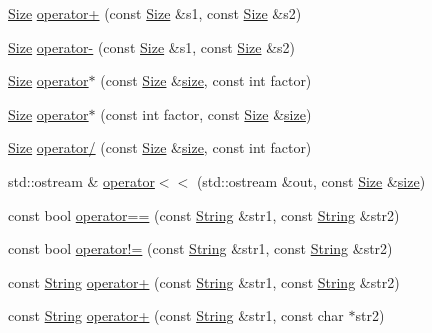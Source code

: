 \begin{DoxyCompactItemize}
\item 
\hyperlink{classprism_1_1_size}{Size} \hyperlink{namespaceprism_a7141aeb35db81548155e44d60c05530e}{operator+} (const \hyperlink{classprism_1_1_size}{Size} \&s1, const \hyperlink{classprism_1_1_size}{Size} \&s2)
\item 
\hyperlink{classprism_1_1_size}{Size} \hyperlink{namespaceprism_ab170e3ca42d85a6766cbc7950ddfb0c4}{operator-\/} (const \hyperlink{classprism_1_1_size}{Size} \&s1, const \hyperlink{classprism_1_1_size}{Size} \&s2)
\item 
\hyperlink{classprism_1_1_size}{Size} \hyperlink{namespaceprism_a3d8e53ee3208e09e8736a77be3f485c9}{operator$\ast$} (const \hyperlink{classprism_1_1_size}{Size} \&\hyperlink{namespaceprism_acd3c0f96adf158a29387191d79c4d874}{size}, const int factor)
\item 
\hyperlink{classprism_1_1_size}{Size} \hyperlink{namespaceprism_acd79758984cccce0dddfb459af65f6e1}{operator$\ast$} (const int factor, const \hyperlink{classprism_1_1_size}{Size} \&\hyperlink{namespaceprism_acd3c0f96adf158a29387191d79c4d874}{size})
\item 
\hyperlink{classprism_1_1_size}{Size} \hyperlink{namespaceprism_ad7e100bd6b1730deaab53d1218e29a67}{operator/} (const \hyperlink{classprism_1_1_size}{Size} \&\hyperlink{namespaceprism_acd3c0f96adf158a29387191d79c4d874}{size}, const int factor)
\item 
std\+::ostream \& \hyperlink{namespaceprism_ad6335168e27f481d86ae42da444006d1}{operator$<$$<$} (std\+::ostream \&out, const \hyperlink{classprism_1_1_size}{Size} \&\hyperlink{namespaceprism_acd3c0f96adf158a29387191d79c4d874}{size})
\item 
const bool \hyperlink{namespaceprism_a0e7bfee93ae735b5af7e566ddd8c4f65}{operator==} (const \hyperlink{classprism_1_1_string}{String} \&str1, const \hyperlink{classprism_1_1_string}{String} \&str2)
\item 
const bool \hyperlink{namespaceprism_a5c2215edf9ab445c3c1791217d131b15}{operator!=} (const \hyperlink{classprism_1_1_string}{String} \&str1, const \hyperlink{classprism_1_1_string}{String} \&str2)
\item 
const \hyperlink{classprism_1_1_string}{String} \hyperlink{namespaceprism_a433f7afd310d95a93cf8c03d1f831812}{operator+} (const \hyperlink{classprism_1_1_string}{String} \&str1, const \hyperlink{classprism_1_1_string}{String} \&str2)
\item 
const \hyperlink{classprism_1_1_string}{String} \hyperlink{namespaceprism_a50879e9455a36b7762514951ca0f47f7}{operator+} (const \hyperlink{classprism_1_1_string}{String} \&str1, const char $\ast$str2)

\end{DoxyCompactItemize}
